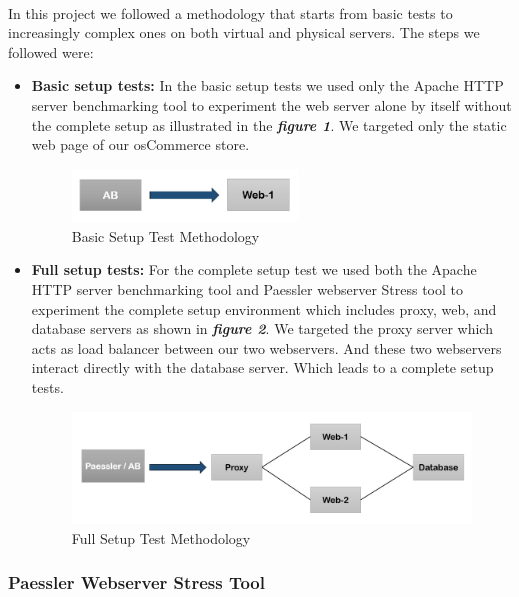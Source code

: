 \paragraph{}
In this project we followed a methodology that starts from basic tests to increasingly complex ones on both virtual and physical servers. The steps we followed were:
\begin{itemize}
    \item \textbf{Basic setup tests:}
 In the basic setup tests we used only the Apache HTTP server benchmarking tool to experiment the web server alone by itself without the complete setup as illustrated in the \textbf{\textit{figure 1}}. 
 We targeted only the static web page of our osCommerce store.
 \begin{figure}[H]
    \centering
    \includegraphics[width=6cm]{Pictures/simple.PNG}
    \caption{Basic Setup Test Methodology}
    \label{fig:QQ3}
\end{figure}
   
    
    
    \item \textbf{Full setup tests:}
 For the complete setup test we used both the Apache HTTP server benchmarking tool and Paessler webserver Stress tool to experiment the complete setup environment which includes proxy, web, and database servers as shown in \textbf{\textit{figure 2}}. 
 We targeted the proxy server which acts as load balancer between our two webservers. And these two webservers interact directly with the database server. Which leads to a complete setup tests.   
 \begin{figure}[H]
    \centering
    \includegraphics[width=12cm]{Pictures/complex.PNG}
    \caption{Full Setup Test Methodology}
    \label{fig:QQ3}
\end{figure}

\end{itemize}

\subsubsection{Paessler Webserver Stress Tool}
